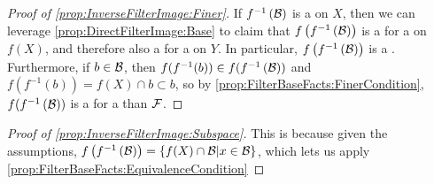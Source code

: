 \begin{prop}
\begin{proof}[Proof of \ref{prop:InverseFilterImage:Finer}]
    If $f^{-1}\left( \mathcal{B}\right)$ is a \FilterBase on $X$, 
    then we can leverage \ref{prop:DirectFilterImage:Base} to 
    claim that $f\left( f^{-1}\left( \mathcal{B}\right)\right)$ is a \FilterBase for a \Filter on $f(X)$, 
    and therefore also a \FilterBase for a \Filter on $Y$. 
    In particular, $f\left( f^{-1}\left( \mathcal{B}\right)\right)$ is a \FilterBase. 
    Furthermore, if $b \in \mathcal{B}$, then $f(f^{-1}(b)) \in f(f^{-1}\left( \mathcal{B}\right))$ and 
    $f(f^{-1}(b))= f(X) \cap b \subset b$, so by \ref{prop:FilterBaseFacts:FinerCondition}, 
    $f(f^{-1}\left( \mathcal{B}\right))$ is a \FilterBase for a \FinerFilter \Filter than $\mathcal{F}$. 
\end{proof}
\begin{proof}[Proof of \ref{prop:InverseFilterImage:Subspace}]
   This is because given the assumptions, 
   $f\left( f^{-1}\left( \mathcal{B}\right)\right) = \{f(X) \cap \mathcal{B} | x \in \mathcal{B}\}$, 
   which lets us apply \ref{prop:FilterBaseFacts:EquivalenceCondition}
\end{proof}
\end{prop}
